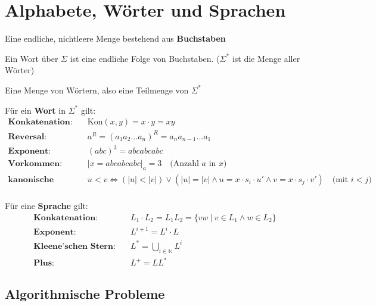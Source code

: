 \documentclass[11pt]{article}
\begin{document}
\section{Alphabete, Wörter und Sprachen}

\begin{description}[labelindent=16pt,style=multiline,leftmargin=5cm, noitemsep]
	\item[Alphabet $\Sigma$:] Eine endliche, nichtleere Menge bestehend aus \textbf{Buchstaben}
	\item[Wort:] Ein Wort {\"u}ber $\Sigma$ ist eine endliche Folge von Buchstaben. ($\Sigma^*$ ist die Menge aller Wörter)
	\item[Sprache $L$:] Eine Menge von Wörtern, also eine Teilmenge von $\Sigma^*$
\end{description}

F{\"u}r ein \textbf{Wort} in $\Sigma^*$ gilt:
\begin{equation*}
\begin{split}
	\textbf{Konkatenation:}\quad & \text{Kon}(x,y) = x \cdot y = xy \\
	\textbf{Reversal:} \quad & a^R = (a_1a_2...a_n)^R = a_na_{n-1}...a_1 \\
	\textbf{Exponent:} \quad & (abc)^3 = abcabcabc \\
	\textbf{Vorkommen:} \quad & |x = abcabcabc|_a = 3\quad\text{(Anzahl $a$ in $x$)} \\
	\textbf{kanonische Ordnung:} \quad & u < v \Leftrightarrow (|u| < |v|) \lor (|u| = |v| \land u = x \cdot s_i \cdot u' \land v = x \cdot s_j \cdot v') \quad\text{(mit $i < j$)} \\
\end{split}
\end{equation*}

F{\"u}r eine \textbf{Sprache} gilt:
\begin{equation*}
\begin{split}
	\textbf{Konkatenation:}\quad & L_1\cdot L_2 = L_1L_2 = \{vw\ |\ v \in L_1 \land w \in L_2\} \\
	\textbf{Exponent:}\quad & L^{i+1} = L^i\cdot L \\
	\textbf{Kleene'schen Stern:}\quad & L^* = \bigcup_{i\in\mathbb{N}}L^i \\
	\textbf{Plus:}\quad & L^+ = LL^*
\end{split}
\end{equation*}

\subsection{Algorithmische Probleme}
\end{document}
